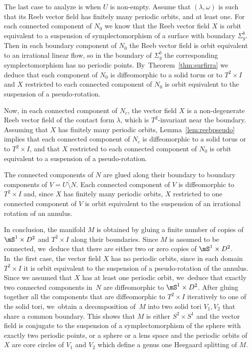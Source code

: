 The last case to analyze is when $U$ is non-empty. Assume that $(\lambda,\omega)$ is such that its Reeb vector field has finitely many periodic orbits, and at least one. For each connected component of $N_0$ we know that the Reeb vector field $X$ is orbit equivalent to a suspension of symplectomorphism of a surface with boundary $\Sigma_g^b$. Then in each boundary component of $N_0$ the Reeb vector field is orbit equivalent to an irrational linear flow, so in the boundary of $\Sigma_g^b$ the corresponding symplectomorphism has no periodic points. By~Theorem~\ref{thm:surfirra} we deduce that each component of $N_0$ is diffeomorphic to a solid torus or to $T^2\times I$ and $X$ restricted to each connected component of $N_0$ is orbit equivalent to the suspension of a pseudo-rotation.

Now, in each connected component of $N_c$, the vector field $X$ is a non-degenerate Reeb vector field of the contact form $\lambda$, which is $T^2$-invariant near the boundary.
Assuming that $X$ has finitely many periodic orbits, Lemma~\ref{lem:reebpseudo} implies that each connected component of $N_c$ is diffeomorphic to a solid torus or to $T^2\times I$, and that $X$ restricted to each connected component of $N_0$ is orbit equivalent to a suspension of a pseudo-rotation.

The connected components of $N$ are glued along their boundary to boundary components of $V=\overline{U\setminus N}$. Each connected component of $V$ is diffeomorphic to $T^2\times I$ and, since $X$ has finitely many periodic orbits, $X$ restricted to one connected component of $V$ is orbit equivalent to the suspension of an irrational rotation of an annulus.

In conclusion, the manifold $M$ is obtained by gluing a finite number of copies of $\mS^1\times\nobreak D^2$ and $T^2\times I$ along their boundaries. Since $M$ is assumed to be connected, we~deduce that there are either two or zero copies of $\mS^1\times D^2$. In~the first case, the vector field $X$ has no periodic orbits, since in each domain $T^2\times I$ it is orbit equivalent to the suspension of a pseudo-rotation of the annulus. Since we assumed that $X$ has at least one periodic orbit, we~deduce that exactly two connected components in~$N$ are diffeomorphic to $\mS^1\times D^2$. After gluing together all the components that are diffeomorphic to $T^2\times I$ iteratively to one of the solid tori, we~obtain a decomposition of~$M$ into two solid tori $V_1, V_2$ that share a common boundary. This shows that $M$ is either $S^2\times S^1$ and the vector field is conjugate to the suspension of a symplectomorphism of the sphere with exactly two periodic points, or a sphere or a lens space and the periodic orbits of $X$ are core circles of $V_1$ and $V_2$ which define a genus one Heegaard splitting of $M$.

